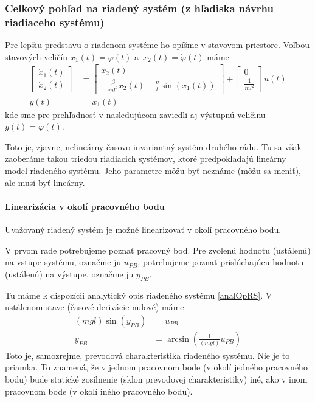 \documentclass[a4paper, 10pt, ]{article}
\begin{document}
\subsubsection{Celkový pohľad na riadený systém (z hľadiska návrhu riadiaceho systému)}

Pre lepšiu predstavu o riadenom systéme ho opíšme v stavovom priestore. Voľbou stavových veličín $x_1(t) = \varphi(t)$ a~$x_2(t) = \dot\varphi(t)$ máme
\begin{subequations} \label{stavopnonlinkyv}
	\begin{align}
		\begin{bmatrix}
			\dot{x}_1(t) \\ \dot{x}_2(t)
		\end{bmatrix}
		&=
		\begin{bmatrix}
			x_2(t) \\ - \frac{\beta}{ml^2} x_2(t) - \frac{g}{l} \sin\left(x_1(t)\right)
		\end{bmatrix}
		+
		\begin{bmatrix}
			0 \\ \frac{1}{ml^2}
		\end{bmatrix}
		u(t) \\
		y(t) &= x_1(t)
	\end{align}
\end{subequations}
kde sme pre prehľadnosť v nasledujúcom zaviedli aj výstupnú veličinu $y(t) = \varphi(t)$.


Toto je, zjavne, nelineárny časovo-invariantný systém druhého rádu. Tu sa však zaoberáme takou triedou riadiacich systémov, ktoré predpokladajú lineárny model riadeného systému. Jeho parametre môžu byť neznáme (môžu sa meniť), ale musí byť lineárny.

\paragraph{Linearizácia v okolí pracovného bodu}

Uvažovaný riadený systém je možné linearizovať v okolí pracovného bodu.

V prvom rade potrebujeme poznať pracovný bod. Pre zvolenú hodnotu (ustálenú) na vstupe systému, označme ju $u_{PB}$, potrebujeme poznať prislúchajúcu hodnotu (ustálenú) na výstupe, označme ju $y_{PB}$.

Tu máme k dispozícii analytický opis riadeného systému \eqref{analOpRS}. V ustálenom stave (časové derivácie nulové) máme
\begin{subequations}
    \begin{align}
        \left(m g l\right)\sin\left(y_{PB}\right) &= u_{PB} \\
         y_{PB} &= \arcsin \left( \frac{1}{ \left(m g l\right)} u_{PB} \right)
    \end{align}
\end{subequations}
Toto je, samozrejme, prevodová charakteristika riadeného systému. Nie je to priamka. To znamená, že v jednom pracovnom bode (v okolí jedného pracovného bodu) bude statické zosilnenie (sklon prevodovej charakteristiky) iné, ako v inom pracovnom bode (v okolí iného pracovného bodu).
\end{document}
